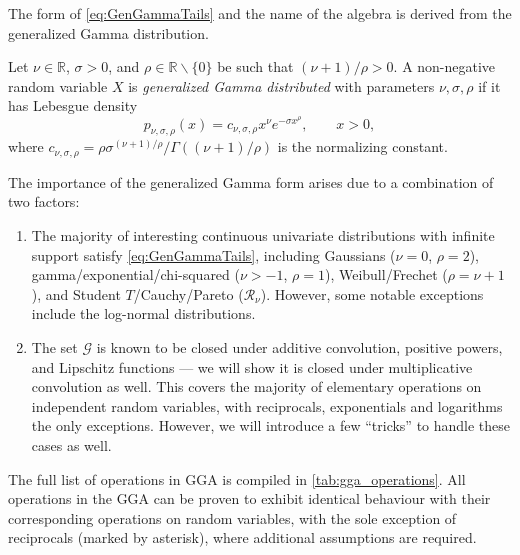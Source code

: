 \documentclass[../thesis.tex]{subfiles}
\begin{document}
The form of \cref{eq:GenGammaTails} and the name of the algebra is derived from the generalized Gamma distribution.
\begin{definition}
  Let $\nu \in \mathbb{R}$, $\sigma > 0$, and $\rho \in \mathbb{R} \backslash \{0\}$ be such that $(\nu+1)/ \rho > 0$.
  A non-negative random variable $X$ is \emph{generalized Gamma distributed} with parameters $\nu,\sigma,\rho$ if it has Lebesgue density
  \begin{equation}
    \label{eq:GenGammaDensity}
    p_{\nu,\sigma,\rho}(x) = c_{\nu,\sigma,\rho} x^\nu e^{-\sigma x^\rho},\qquad x > 0,
  \end{equation}
  where $c_{\nu,\sigma,\rho} = \rho \sigma^{(\nu+1)/\rho} / \Gamma((\nu+1)/\rho)$ is the normalizing constant. %
\end{definition}
The importance of the generalized Gamma form arises due to a combination of two factors:
\begin{enumerate}[label={(\roman*)},leftmargin=*]
  \item The majority of interesting continuous univariate distributions with infinite support satisfy \cref{eq:GenGammaTails}, including
        Gaussians ($\nu=0$, $\rho=2$),
        gamma/exponential/chi-squared ($\nu > -1$, $\rho=1$), Weibull/Frechet ($\rho = \nu + 1$), and
        Student $T$/Cauchy/Pareto ($\mathcal{R}_\nu$).
        However, some notable exceptions include the log-normal distributions.
  \item The set $\mathcal{G}$ is known to be closed under additive convolution, positive powers, and Lipschitz functions --- we will show it is closed under multiplicative convolution as well. This covers the majority of elementary operations on independent random variables, with reciprocals, exponentials and logarithms the only exceptions. However, we will introduce a few ``tricks'' to handle these cases as well.
\end{enumerate}
The full list of operations in GGA is compiled in \cref{tab:gga_operations}. All operations in the GGA can be proven to exhibit identical behaviour with their corresponding operations on random variables, with the sole exception of reciprocals (marked by asterisk), where additional assumptions are required.

\end{document}
